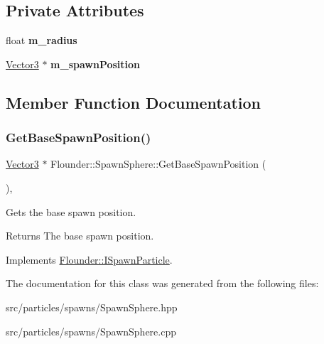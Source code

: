 \subsection*{Private Attributes}
\begin{DoxyCompactItemize}
\item 
\mbox{\label{class_flounder_1_1_spawn_sphere_afc787181b06dde4206526ce599312d89}} 
float {\bfseries m\+\_\+radius}
\item 
\mbox{\label{class_flounder_1_1_spawn_sphere_ae3e37b33a6faa647c5369f76f4063834}} 
\hyperlink{class_flounder_1_1_vector3}{Vector3} $\ast$ {\bfseries m\+\_\+spawn\+Position}
\end{DoxyCompactItemize}


\subsection{Member Function Documentation}
\mbox{\label{class_flounder_1_1_spawn_sphere_aed154e6e7cf50de491fa881e952dc487}} 
\subsubsection{\texorpdfstring{Get\+Base\+Spawn\+Position()}{GetBaseSpawnPosition()}}
{\footnotesize\ttfamily \hyperlink{class_flounder_1_1_vector3}{Vector3} $\ast$ Flounder\+::\+Spawn\+Sphere\+::\+Get\+Base\+Spawn\+Position (\begin{DoxyParamCaption}{ }\end{DoxyParamCaption})\hspace{0.3cm}{\ttfamily [override]}, {\ttfamily [virtual]}}



Gets the base spawn position. 

\begin{DoxyReturn}{Returns}
The base spawn position. 
\end{DoxyReturn}


Implements \hyperlink{class_flounder_1_1_i_spawn_particle_ac4adda7b65431918162f52ac1f4ce57d}{Flounder\+::\+I\+Spawn\+Particle}.



The documentation for this class was generated from the following files\+:\begin{DoxyCompactItemize}
\item 
src/particles/spawns/Spawn\+Sphere.\+hpp\item 
src/particles/spawns/Spawn\+Sphere.\+cpp\end{DoxyCompactItemize}
